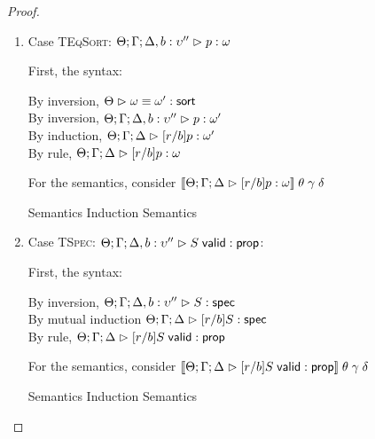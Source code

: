 \begin{proof}
\begin{enumerate}
\item Case \textsc{TEqSort}: $\judgeA[\Theta; \Gamma; \Delta, b:\upsilon'']{p}{\omega}$
  
  First, the syntax:
  \begin{tabbedproof}
    \oo By inversion, $\judgeSortEq{\omega}{\omega'}$ \\
    \oo By inversion, $\judgeA[\Theta; \Gamma; \Delta, b:\upsilon'']{p}{\omega'}$ \\
    \oo By induction, $\judgeA[\Theta; \Gamma; \Delta]{[r/b]p}{\omega'}$ \\
    \oo By rule, $\judgeA[\Theta; \Gamma; \Delta]{[r/b]p}{\omega}$ \\
  \end{tabbedproof}

  For the semantics, consider $\interp{\judgeA[\Theta; \Gamma; \Delta]{[r/b]p}{\omega}}\;\theta\;\gamma\;\delta$ \\
  \begin{eqnproof}
          {Semantics}
          {Induction}
          {Semantics}
  \end{eqnproof}

\item Case \textsc{TSpec}: $\judgeA[\Theta; \Gamma; \Delta, b:\upsilon'']{\validprop{S}}{\assert}$:
  
  First, the syntax:
  \begin{tabbedproof}
    \oo By inversion, $\judgeS[\Theta; \Gamma; \Delta, b:\upsilon'']{S}$ \\
    \oo By mutual induction $\judgeS[\Theta; \Gamma; \Delta]{[r/b]S}$\\
    \oo By rule, $\judgeA[\Theta; \Gamma; \Delta]{[r/b]\validprop{S}}{\assert}$
  \end{tabbedproof}

  For the semantics, consider $\interp{\judgeA[\Theta; \Gamma; \Delta]{[r/b]\validprop{S}}{\assert}}\;\theta\;\gamma\;\delta$ 
  \begin{eqnproof}
          {Semantics}
          {Induction}
          {Semantics}
  \end{eqnproof}


\end{enumerate}
\end{proof}
